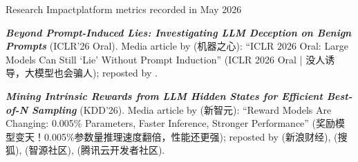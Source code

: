 \begin{rSectionTiny}{Research Impact}{platform metrics recorded in May 2026}
{    \noindent \textbf{\textit{Beyond Prompt-Induced Lies: Investigating LLM Deception on Benign Prompts}} (ICLR'26 Oral). Media article by  (机器之心): ``ICLR 2026 Oral: Large Models Can Still `Lie' Without Prompt Induction'' (ICLR 2026 Oral | 没人诱导，大模型也会骗人); reposted by .\par\vspace{0.1em}

    \noindent \textbf{\textit{Mining Intrinsic Rewards from LLM Hidden States for Efficient Best-of-N Sampling}} (KDD'26). Media article by  (新智元): ``Reward Models Are Changing: 0.005\% Parameters, Faster Inference, Stronger Performance'' (奖励模型变天！0.005\%参数量推理速度翻倍，性能还更强); reposted by  (新浪财经),  (搜狐),  (智源社区),  (腾讯云开发者社区).
  }
\end{rSectionTiny}
